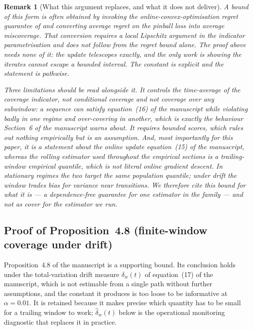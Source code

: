 \documentclass[preprint,11pt,authoryear]{elsarticle}
\newtheorem{remark}[theorem]{Remark}
\newcommand{\1}{\boldsymbol{1}}
\begin{document}
\begin{remark}[What this argument replaces, and what it does not deliver]
	\label{rem:ogd_scope}
	A bound of this form is often obtained by invoking the
	online-convex-optimisation regret guarantee of \citet{zinkevich2003online}
	and converting average regret on the pinball loss into average miscoverage.
	That conversion requires a local Lipschitz argument in the indicator
	parametrisation and does not follow from the regret bound alone. The proof
	above needs none of it: the update telescopes exactly, and the only work is
	showing the iterates cannot escape a bounded interval. The constant is
	explicit and the statement is pathwise.

	Three limitations should be read alongside it. It controls the
	\emph{time-average} of the coverage indicator, not conditional coverage and
	not coverage over any subwindow: a sequence can satisfy
	equation~(16) of the manuscript while violating badly in one regime and
	over-covering in another, which is exactly the behaviour
	Section~6 of the manuscript warns about. It requires bounded scores, which
	rules out nothing empirically but is an assumption. And, most importantly
	for this paper, it is a statement about the \emph{online update}
	equation~(15) of the manuscript, whereas the rolling estimator used throughout the
	empirical sections is a trailing-window empirical quantile, which is not
	literal online gradient descent. In stationary regimes the two target the
	same population quantile; under drift the window trades bias for variance
	near transitions. We therefore cite this bound for what it is --- a
	dependence-free guarantee for one estimator in the family --- and not as
	cover for the estimator we run.
\end{remark}

\subsection{Proof of Proposition~4.8 (finite-window coverage under drift)}
\label{app:rolling_drift}

Proposition~4.8 of the manuscript is a supporting bound. Its conclusion holds
under the total-variation drift measure $\delta_w(t)$ of equation~(17) of the
manuscript, which is not estimable from a single path without further
assumptions, and the constant it produces is too loose to be informative at
$\alpha = 0.01$. It is retained because it makes precise which quantity has to be
small for a trailing window to work; $\hat\delta_w(t)$ below is the operational
monitoring diagnostic that replaces it in practice.
\end{document}
